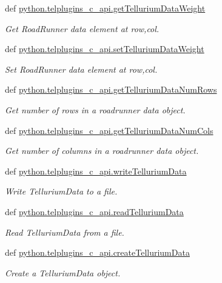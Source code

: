 \begin{DoxyCompactItemize}
def \hyperlink{group__utilities_ga26e4023a436617521a74028f8e9f28db}{python.\-telplugins\-\_\-c\-\_\-api.\-get\-Tellurium\-Data\-Weight}
\begin{DoxyCompactList}\small\item\em Get Road\-Runner data element at row,col. \end{DoxyCompactList}\item 
def \hyperlink{group__utilities_ga1f18e55238b916acf09167b7c48d9828}{python.\-telplugins\-\_\-c\-\_\-api.\-set\-Tellurium\-Data\-Weight}
\begin{DoxyCompactList}\small\item\em Set Road\-Runner data element at row,col. \end{DoxyCompactList}\item 
def \hyperlink{group__utilities_gafe4fcc3d8aa22661d27dcb05e8d419f1}{python.\-telplugins\-\_\-c\-\_\-api.\-get\-Tellurium\-Data\-Num\-Rows}
\begin{DoxyCompactList}\small\item\em Get number of rows in a roadrunner data object. \end{DoxyCompactList}\item 
def \hyperlink{group__utilities_ga05137f4616ffbc8ddefaab88ef51e5f8}{python.\-telplugins\-\_\-c\-\_\-api.\-get\-Tellurium\-Data\-Num\-Cols}
\begin{DoxyCompactList}\small\item\em Get number of columns in a roadrunner data object. \end{DoxyCompactList}\item 
def \hyperlink{group__utilities_ga90c64ba885e72a7387657efa78ad7a5d}{python.\-telplugins\-\_\-c\-\_\-api.\-write\-Tellurium\-Data}
\begin{DoxyCompactList}\small\item\em Write Tellurium\-Data to a file. \end{DoxyCompactList}\item 
def \hyperlink{group__utilities_ga9b5751ae04608985ee46c2df25c15134}{python.\-telplugins\-\_\-c\-\_\-api.\-read\-Tellurium\-Data}
\begin{DoxyCompactList}\small\item\em Read Tellurium\-Data from a file. \end{DoxyCompactList}\item 
def \hyperlink{group__utilities_gaef46dc6f90e13a14938a2b42a1924948}{python.\-telplugins\-\_\-c\-\_\-api.\-create\-Tellurium\-Data}
\begin{DoxyCompactList}\small\item\em Create a Tellurium\-Data object. \end{DoxyCompactList}\item 

\end{DoxyCompactItemize}
